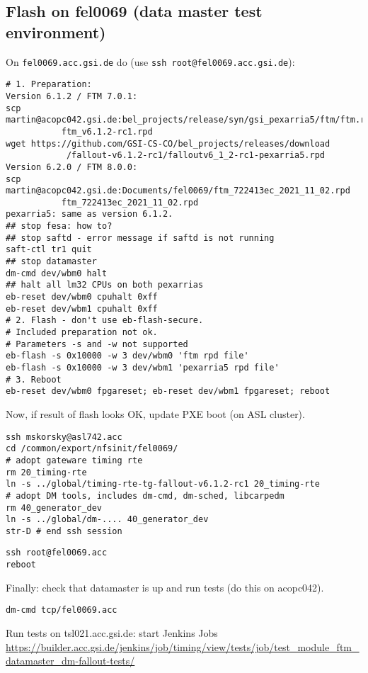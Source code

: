 \documentclass[12pt,a4paper]{report}
\begin{document}
\subsection{Flash on fel0069 (data master test environment)}
On \texttt{fel0069.acc.gsi.de} do (use \texttt{ssh root@fel0069.acc.gsi.de}):
\begin{verbatim}
# 1. Preparation:
Version 6.1.2 / FTM 7.0.1:
scp martin@acopc042.gsi.de:bel_projects/release/syn/gsi_pexarria5/ftm/ftm.rpd
           ftm_v6.1.2-rc1.rpd
wget https://github.com/GSI-CS-CO/bel_projects/releases/download
            /fallout-v6.1.2-rc1/falloutv6_1_2-rc1-pexarria5.rpd
Version 6.2.0 / FTM 8.0.0:
scp martin@acopc042.gsi.de:Documents/fel0069/ftm_722413ec_2021_11_02.rpd
           ftm_722413ec_2021_11_02.rpd
pexarria5: same as version 6.1.2.
## stop fesa: how to?
## stop saftd - error message if saftd is not running
saft-ctl tr1 quit
## stop datamaster
dm-cmd dev/wbm0 halt
## halt all lm32 CPUs on both pexarrias
eb-reset dev/wbm0 cpuhalt 0xff
eb-reset dev/wbm1 cpuhalt 0xff
# 2. Flash - don't use eb-flash-secure.
# Included preparation not ok.
# Parameters -s and -w not supported
eb-flash -s 0x10000 -w 3 dev/wbm0 'ftm rpd file'
eb-flash -s 0x10000 -w 3 dev/wbm1 'pexarria5 rpd file'
# 3. Reboot
eb-reset dev/wbm0 fpgareset; eb-reset dev/wbm1 fpgareset; reboot
\end{verbatim}
Now, if result of flash looks OK, update PXE boot (on ASL cluster).
\begin{verbatim}
ssh mskorsky@asl742.acc
cd /common/export/nfsinit/fel0069/
# adopt gateware timing rte
rm 20_timing-rte
ln -s ../global/timing-rte-tg-fallout-v6.1.2-rc1 20_timing-rte
# adopt DM tools, includes dm-cmd, dm-sched, libcarpedm
rm 40_generator_dev
ln -s ../global/dm-.... 40_generator_dev
str-D # end ssh session
\end{verbatim}
\begin{verbatim}
ssh root@fel0069.acc
reboot
\end{verbatim}
Finally: check that datamaster is up and run tests (do this on acopc042).
\begin{verbatim}
dm-cmd tcp/fel0069.acc
\end{verbatim}
Run tests on tsl021.acc.gsi.de: start Jenkins Jobs \url{https://builder.acc.gsi.de/jenkins/job/timing/view/tests/job/test_module_ftm_datamaster_dm-fallout-tests/}
\end{document}
